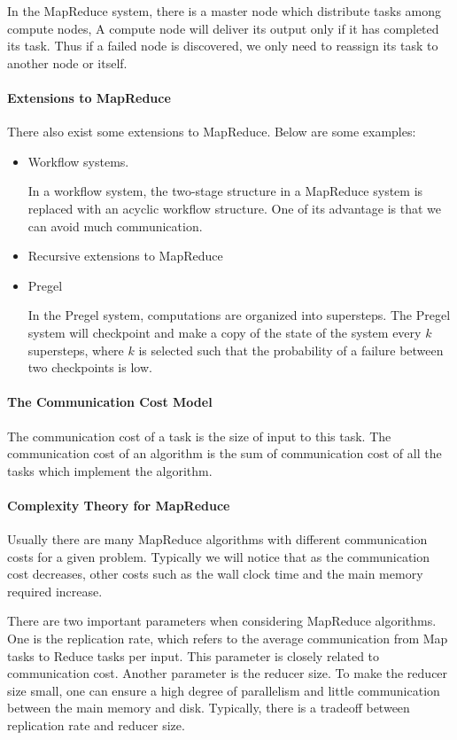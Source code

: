 \documentclass{article}
\begin{document}
In the MapReduce system, there is a master node which distribute tasks among compute nodes, A compute node will deliver its output only if it has completed its task. Thus if a failed node is discovered, we only need to reassign its task to another node or itself.

\paragraph{Extensions to MapReduce} 
There also exist some extensions to MapReduce. Below are some examples:
\begin{itemize}
\item Workflow systems.

In a workflow system, the two-stage structure in a MapReduce system is replaced with an acyclic workflow structure. One of its advantage is that we can avoid much communication.

\item Recursive extensions to MapReduce

\item Pregel

In the Pregel system, computations are organized into supersteps. The Pregel system will checkpoint and make a copy of the state of the system every $k$ supersteps, where $k$ is selected such that the probability of a failure between two checkpoints is low.
\end{itemize}

\paragraph{The Communication Cost Model}
The communication cost of a task is the size of input to this task. The communication cost of an algorithm is the sum of communication cost of all the tasks which implement the algorithm.

\paragraph{Complexity Theory for MapReduce}
Usually there are many MapReduce algorithms with different communication costs for a given problem. Typically we will notice that as the communication cost decreases, other costs such as the wall clock time and the main memory required increase.

There are two important parameters when considering MapReduce algorithms. One is the replication rate, which refers to the average communication from Map tasks to Reduce tasks per input. This parameter is closely related to communication cost. Another parameter is the reducer size. To make the reducer size small, one can ensure a high degree of parallelism and little communication between the main memory and disk. Typically, there is a tradeoff between replication rate and reducer size.
\end{document}
